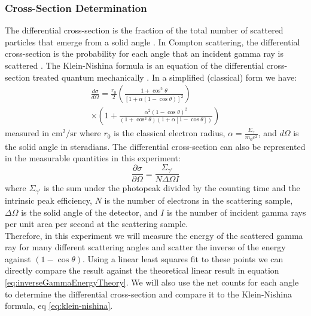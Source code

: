 \documentclass[%
reprint,
amsmath,amssymb,
aps,
]{revtex4-2}
\begin{document}
			\subsubsection{Cross-Section Determination}
			The differential cross-section is the fraction of the total number of scattered particles that emerge from a solid angle \cite{fowler}. In Compton scattering, the differential cross-section is the probability for each angle that an incident gamma ray is scattered \cite{manual1}. The Klein-Nishina formula is an equation of the differential cross-section treated quantum mechanically \cite{yazaki}. In a simplified (classical) form we have:
			\begin{multline}
				\frac{d\sigma}{d\Omega} = \frac{r_0}{2}\left( \frac{1 + \cos^2 \theta}{\left[1 + \alpha (1-\cos\theta)\right]^2} \right) \\ \times \left( 1 + \frac{\alpha^2 (1-\cos\theta)^2}{(1 + \cos^2 \theta)(1 + \alpha[1 - \cos\theta])} \right)
				\label{eq:klein-nishina}
			\end{multline}measured in $\text{cm}^2 / \text{sr}$ where $r_0$ is the classical electron radius, $\alpha = \frac{E_\gamma}{m_0 c^2}$, and $d\Omega$ is the solid angle in steradians. The differential cross-section can also be represented in the measurable quantities in this experiment:
			\begin{equation}
				\frac{\partial \sigma}{\partial \Omega} = \frac{\Sigma_{\gamma'}}{N \Delta \Omega I}
			\end{equation}where $\Sigma_{\gamma'}$ is the sum under the photopeak divided by the counting time and the intrinsic peak efficiency, $N$ is the number of electrons in the scattering sample, $\Delta \Omega$ is the solid angle of the detector, and $I$ is the number of incident gamma rays per unit area per second at the scattering sample.\\
			
			Therefore, in this experiment we will measure the energy of the scattered gamma ray for many different scattering angles and scatter the inverse of the energy against $(1-\cos\theta)$. Using a linear least squares fit to these points we can directly compare the result against the theoretical linear result in equation \ref{eq:inverseGammaEnergyTheory}. We will also use the net counts for each angle to determine the differential cross-section and compare it to the Klein-Nishina formula, eq \ref{eq:klein-nishina}.
\end{document}
